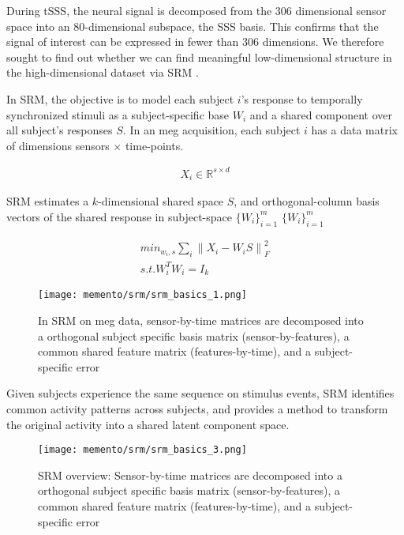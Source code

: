 During \gls{tSSS}, the neural signal is decomposed from the 306 dimensional sensor space into an 80-dimensional subspace, the \gls{SSS} basis.
This confirms that the signal of interest can be expressed in fewer than 306 dimensions.
We therefore sought to find out whether we can find meaningful low-dimensional structure in the high-dimensional dataset via \gls{SRM} \citep{NIPS2015_b3967a0e}.

In \gls{SRM}, the objective is to model each subject $i$'s response to temporally synchronized stimuli as a subject-specific base $W_i$ and a shared component over all subject's responses $S$.
In an \gls{meg} acquisition, each subject $i$ has a data matrix of dimensions sensors $\times$ time-points.


\begin{equation}
	\begin{aligned}
    X_i \in \mathbb{R}^{s \times d}
	\end{aligned}
	\label{eq:sss}
\end{equation}

\gls{SRM} estimates a $k$-dimensional shared space $S$, and orthogonal-column basis vectors of the shared response in subject-space  $\{W_i\}^m_{i=1}$  $\{W_i\}^m_{i=1}$


\begin{equation}
	\begin{aligned}
	    min_{w_i, s}\sum_i{\|X_i - W_iS \|}^2_F \\
	s.t. W^T_iW_i = I_k
	\end{aligned}
	\label{eq:sss}
\end{equation}


\begin{figure}
	\centering
	\texttt{[image: memento/srm/srm\_basics\_1.png]}
	\caption[SRM overview]{In \gls{SRM} on \gls{meg} data, sensor-by-time matrices are decomposed into a orthogonal subject specific basis matrix (sensor-by-features), a common shared feature matrix (features-by-time), and a subject-specific error}
	\label{fig:srm-basics}
\end{figure}

Given subjects experience the same sequence on stimulus events, \gls{SRM} identifies common activity patterns across subjects, and provides a method to transform the original activity into a shared latent component space.


\begin{figure}
	\centering
	\texttt{[image: memento/srm/srm\_basics\_3.png]}
	\caption[SRM overview]{SRM overview: Sensor-by-time matrices are decomposed into a orthogonal subject specific basis matrix (sensor-by-features), a common shared feature matrix (features-by-time), and a subject-specific error}
	\label{fig:srm-basics-multi}
\end{figure}

